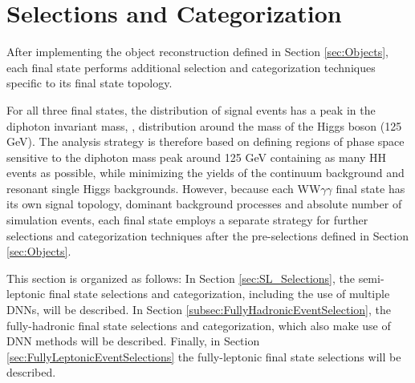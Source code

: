 \section{Selections and Categorization} \label{fig:HHWWgg_SelectionsAndCat}

After implementing the object reconstruction defined in Section \ref{sec:Objects}, each final state performs additional selection and categorization techniques specific to its final state topology.

For all three final states, the distribution of signal events has a peak in the diphoton invariant mass, \mgg, distribution around the mass of the Higgs boson (125 GeV). The analysis strategy is therefore based on defining regions of phase space sensitive to the diphoton mass peak around 125 GeV containing as many HH events as possible, while minimizing the yields of the continuum background and resonant single Higgs backgrounds. However, because each WW$\gamma\gamma$ final state has its own signal topology, dominant background processes and absolute number of simulation events, each final state employs a separate strategy for further selections and categorization techniques after the pre-selections defined in Section \ref{sec:Objects}.

This section is organized as follows: In Section \ref{sec:SL_Selections}, the semi-leptonic final state selections and categorization, including the use of multiple DNNs, will be described. In Section \ref{subsec:FullyHadronicEventSelection}, the fully-hadronic final state selections and categorization, which also make use of DNN methods will be described. Finally, in Section \ref{sec:FullyLeptonicEventSelections} the fully-leptonic final state selections will be described. 



\clearpage



\clearpage


